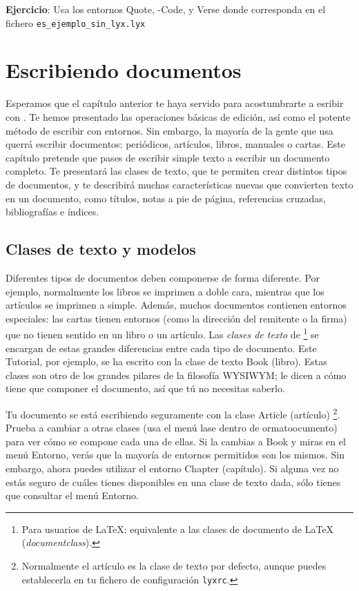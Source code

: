 \textbf{Ejercicio}: Usa los entornos \textsf{Quote, \LyX{}-Code,}
y \textsf{Verse} donde corresponda en el fichero \texttt{es\_ejemplo\_sin\_lyx.lyx}


\section{Escribiendo documentos}

Esperamos que el capítulo anterior te haya servido para acostumbrarte
a esribir con \LyX{}. Te hemos presentado las operaciones básicas
de edición, así como el potente método de escribir con entornos. Sin
embargo, la mayoría de la gente que usa \LyX{} querrá escribir documentos:
periódicos, artículos, libros, manuales o cartas. Este capítulo pretende
que pases de escribir simple texto a escribir un documento completo.
Te presentará las clases de texto, que te permiten crear distintos
tipos de documentos, y te describirá muchas características nuevas
que convierten texto en un documento, como títulos, notas a pie de
página, referencias cruzadas, bibliografías e índices.


\subsection{Clases de texto y modelos}

\label{sec:textclasses}Diferentes tipos de documentos deben componerse
de forma diferente. Por ejemplo, normalmente los libros se imprimen
a doble cara, mientras que los artículos se imprimen a simple. Además,
muchos documentos contienen entornos especiales: las cartas tienen
entornos (como la dirección del remitente o la firma) que no tienen
sentido en un libro o un artículo. Las \emph{clases de texto} de \LyX{}%
\footnote{Para usuarios de \LaTeX{}: equivalente a las clases de documento de
\LaTeX{} (\emph{documentclass}).%
} se encargan de estas grandes diferencias entre cada tipo de documento.
Este Tutorial, por ejemplo, se ha escrito con la clase de texto \textsf{Book}
(libro). Estas clases son otro de los grandes pilares de la filosofía
WYSIWYM; le dicen a \LyX{} cómo tiene que componer el documento, así
que tú no necesitas saberlo.

Tu documento se está escribiendo seguramente con la clase \textsf{Article}
(artículo)%
\footnote{Normalmente el artículo es la clase de texto por defecto, aunque puedes
establecerla en tu fichero de configuración \texttt{lyxrc}.%
}. Prueba a cambiar a otras clases (usa el menú \textsf{}\textsf{lase}
dentro de \textsf{}\textsf{ormato\lyxarrow{}}\textsf{}\textsf{ocumento})
para ver cómo se compone cada una de ellas. Si la cambias a \textsf{Book}
y miras en el menú \textsf{Entorno}, verás que la mayoría de entornos
permitidos son los mismos. Sin embargo, ahora puedes utilizar el entorno
\textsf{Chapter} (capítulo). Si alguna vez no estás seguro de cuáles
tienes disponibles en una clase de texto dada, sólo tienes que consultar
el menú \textsf{Entorno}.

